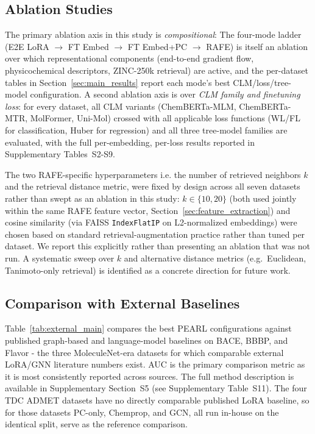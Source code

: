 \documentclass[pdflatex,sn-mathphys-num]{sn-jnl}%
\begin{document}
\subsection{Ablation Studies}\label{sec:ablations}
The primary ablation axis in this study is \emph{compositional}: The four-mode ladder (E2E LoRA $\rightarrow$ FT Embed $\rightarrow$ FT Embed+PC $\rightarrow$ RAFE) is itself an ablation over which representational components (end-to-end gradient flow, physicochemical descriptors, ZINC-250k retrieval) are active, and the per-dataset tables in Section~\ref{sec:main_results} report each mode's best CLM/loss/tree-model configuration. A second ablation axis is over \emph{CLM family and finetuning loss}: for every dataset, all CLM variants (ChemBERTa-MLM, ChemBERTa-MTR, MolFormer, Uni-Mol) crossed with all applicable loss functions (WL/FL for classification, Huber for regression) and all three tree-model families are evaluated, with the full per-embedding, per-loss results reported in Supplementary Tables~S2-S9.

The two RAFE-specific hyperparameters i.e. the number of retrieved neighbors $k$ and the retrieval distance metric, were fixed by design across all seven datasets rather than swept as an ablation in this study: $k \in \{10, 20\}$ (both used jointly within the same RAFE feature vector, Section~\ref{sec:feature_extraction}) and cosine similarity (via FAISS \texttt{IndexFlatIP} on L2-normalized embeddings) were chosen based on standard retrieval-augmentation practice rather than tuned per dataset. We report this explicitly rather than presenting an ablation that was not run. A systematic sweep over $k$ and alternative distance metrics (e.g.\ Euclidean, Tanimoto-only retrieval) is identified as a concrete direction for future work.

\subsection{Comparison with External Baselines}\label{sec:external_comparison}
Table~\ref{tab:external_main} compares the best PEARL configurations against published graph-based and language-model baselines on BACE, BBBP, and Flavor - the three MoleculeNet-era datasets for which comparable external LoRA/GNN literature numbers exist. AUC is the primary comparison metric as it is most consistently reported across sources. The full method description is available in Supplementary Section~S5 (see Supplementary Table~S11). The four TDC ADMET datasets have no directly comparable published LoRA baseline, so for those datasets PC-only, Chemprop, and GCN, all run in-house on the identical split, serve as the reference comparison.
\end{document}
